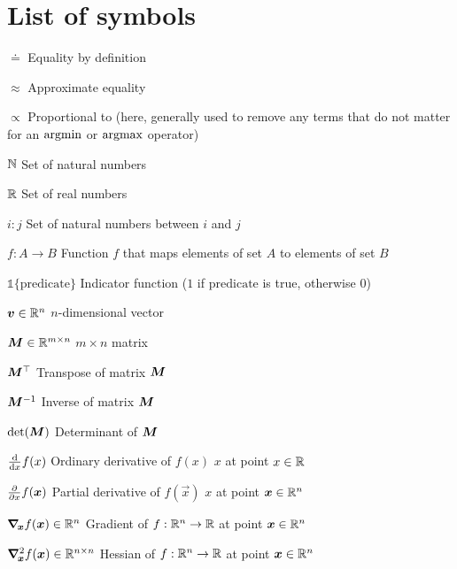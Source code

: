 \section*{List of symbols}

\vspace{10mm}

\begin{abbrv}
    \item[$\doteq$] Equality by definition
    \item[$\approx$] Approximate equality
    \item[$\propto$] Proportional to (here, generally used to remove any terms that do not matter for an $\argmin$ or $\argmax$ operator)
    \item[$\N$] Set of natural numbers
    \item[$\R$] Set of real numbers
    \item[$i:j$] Set of natural numbers between $i$ and $j$
    \item[$f: A \to B$] Function $f$ that maps elements of set $A$ to elements of set $B$
    \item[$\mathbb{1}\{\mathrm{predicate}\}$] Indicator function ($1$ if $\mathrm{predicate}$ is true, otherwise $0$)

    \item

    \item[$\vec{v} \in \R^n$] $n$-dimensional vector
    \item[$\mat{M} \in \R^{m\times n}$] $m \times n$ matrix
    \item[$\transpose{\mat{M}}$] Transpose of matrix $\mat{M}$
    \item[$\inv{\mat{M}}$] Inverse of matrix $\mat{M}$
    \item[$\det{\mat{M}}$] Determinant of $\mat{M}$

    \item

    \item[$\odv*{f(x)}{x}$] Ordinary derivative of $f(x)$ \wrt $x$ at point $x\in\R$
    \item[$\pdv*{f(\vec{x})}{x}$] Partial derivative of $f(\vec{x})$ \wrt $x$ at point $\vec{x}\in\R^n$
    \item[$\grad{f(\vec{x})}{\vec{x}} \in \R^n$] Gradient of $f: \R^n \to \R$ at point $\vec{x}\in\R^n$
    \item[$\hess{f(\vec{x})}{\vec{x}} \in \R^{n\times n}$] Hessian of $f: \R^n \to \R$ at point $\vec{x}\in\R^n$
\end{abbrv}
